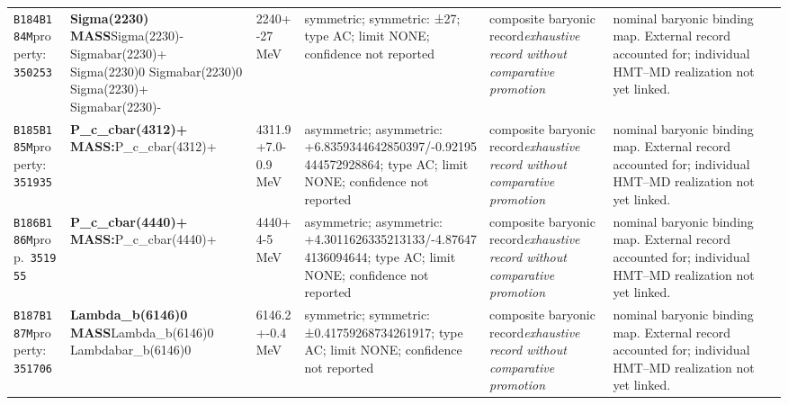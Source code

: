 \begin{landscape}
\begin{longtable}{L{1.85cm}L{4.45cm}L{2.35cm}L{4.05cm}L{3.35cm}L{7.15cm}}
\texttt{B184}\newline \texttt{B184M}\newline property:\ \texttt{350253} & \textbf{Sigma(2230) MASS}\newline Sigma(2230)- \textbar{}\allowbreak{} Sigmabar(2230)+ \textbar{}\allowbreak{} Sigma(2230)0 \textbar{}\allowbreak{} Sigmabar(2230)0 \textbar{}\allowbreak{} Sigma(2230)+ \textbar{}\allowbreak{} Sigmabar(2230)- & 2240+-27\,MeV & symmetric; symmetric: ±27; type AC; limit NONE; confidence not reported & composite baryonic record\newline \emph{exhaustive record without comparative promotion} & nominal baryonic binding map. External record accounted for; individual HMT--MD realization not yet linked. \\
\texttt{B185}\newline \texttt{B185M}\newline property:\ \texttt{351935} & \textbf{P\_\allowbreak{}c\_\allowbreak{}cbar(4312)+ MASS:}\newline P\_\allowbreak{}c\_\allowbreak{}cbar(4312)+ & 4311.9+7.0-0.9\,MeV & asymmetric; asymmetric: +6.8359344642850397/-0.92195444572928864; type AC; limit NONE; confidence not reported & composite baryonic record\newline \emph{exhaustive record without comparative promotion} & nominal baryonic binding map. External record accounted for; individual HMT--MD realization not yet linked. \\
\texttt{B186}\newline \texttt{B186M}\newline prop.\ \texttt{351955} & \textbf{P\_\allowbreak{}c\_\allowbreak{}cbar(4440)+ MASS:}\newline P\_\allowbreak{}c\_\allowbreak{}cbar(4440)+ & 4440+4-5\,MeV & asymmetric; asymmetric: +4.3011626335213133/-4.876474136094644; type AC; limit NONE; confidence not reported & composite baryonic record\newline \emph{exhaustive record without comparative promotion} & nominal baryonic binding map. External record accounted for; individual HMT--MD realization not yet linked. \\
\texttt{B187}\newline \texttt{B187M}\newline property:\ \texttt{351706} & \textbf{Lambda\_\allowbreak{}b(6146)0 MASS}\newline Lambda\_\allowbreak{}b(6146)0 \textbar{}\allowbreak{} Lambdabar\_\allowbreak{}b(6146)0 & 6146.2+-0.4\,MeV & symmetric; symmetric: ±0.41759268734261917; type AC; limit NONE; confidence not reported & composite baryonic record\newline \emph{exhaustive record without comparative promotion} & nominal baryonic binding map. External record accounted for; individual HMT--MD realization not yet linked. \\

\end{longtable}
\end{landscape}
